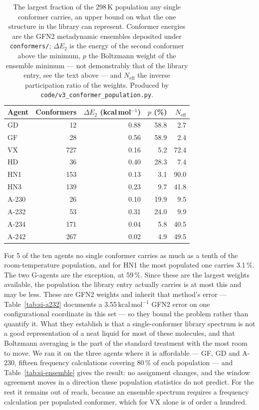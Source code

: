 \begin{table}[htbp]
\centering
\caption{The largest fraction of the 298\,K population any single conformer carries, an
upper bound on what the one structure in the library can represent. Conformer energies are
the GFN2 metadynamic ensembles deposited under \texttt{conformers/}; $\Delta E_2$ is the
energy of the second conformer above the minimum, $p$ the Boltzmann weight of the ensemble
minimum --- not demonstrably that of the library entry, see the text above --- and
$N_\mathrm{eff}$ the inverse participation ratio of the weights. Produced by
\texttt{code/v3\_conformer\_population.py}.}
\label{tab:si-confpop}
\small
\begin{tabular}{lrrrr}
\toprule
Agent & Conformers & $\Delta E_2$ (kcal\,mol$^{-1}$) & $p$ (\%) & $N_\mathrm{eff}$ \\
\midrule
GD & 12 & 0.88 & 58.8 & 2.7 \\
GF & 28 & 0.56 & 58.9 & 2.4 \\
VX & 727 & 0.16 & 5.2 & 72.4 \\
HD & 36 & 0.40 & 28.3 & 7.4 \\
HN1 & 153 & 0.13 & 3.1 & 90.0 \\
HN3 & 139 & 0.23 & 9.7 & 41.8 \\
A-230 & 26 & 0.10 & 19.9 & 9.5 \\
A-232 & 53 & 0.31 & 24.0 & 9.9 \\
A-234 & 171 & 0.04 & 5.8 & 40.5 \\
A-242 & 267 & 0.02 & 4.9 & 49.5 \\
\bottomrule
\end{tabular}

\begin{flushleft}\footnotesize For 5 of the ten agents no single conformer carries as much
as a tenth of the room-temperature population, and for HN1 the most populated one carries
3.1\,\%. The two G-agents are the exception, at 59\,\%. Since these are the largest
weights available, the population the library entry actually carries is at most this and
may be less. These are GFN2 weights and inherit
that method's error --- Table~\ref{tab:si-a232} documents a 3.55\,kcal\,mol$^{-1}$ GFN2
error on one configurational coordinate in this set --- so they bound the problem rather
than quantify it. What they establish is that a single-conformer library spectrum is not a
good representation of a neat liquid for most of these molecules, and that Boltzmann
averaging is the part of the standard treatment with the most room to move. We ran it on
the three agents where it is affordable --- GF, GD and A-230, fifteen frequency
calculations covering 80\,\% of each population --- and Table~\ref{tab:si-ensemble} gives
the result: no assignment changes, and the window agreement moves in a direction these
population statistics do not predict. For the rest it remains out of reach, because an
ensemble spectrum requires a frequency calculation per populated conformer, which for VX
alone is of order a hundred.\end{flushleft}
\end{table}
